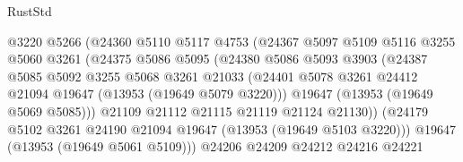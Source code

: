 \begin{lexlean}{RustStd}
\begin{coremodule}
                                @3220
                                @5266
                                (@24360
                                  @5110
                                  @5117
                                  @4753
                                  (@24367
                                    @5097
                                    @5109
                                    @5116
                                    @3255
                                    @5060
                                    @3261
                                    (@24375
                                      @5086
                                      @5095
                                      (@24380
                                        @5086
                                        @5093
                                        @3903
                                        (@24387
                                          @5085
                                          @5092
                                          @3255
                                          @5068
                                          @3261
                                          @21033
                                          (@24401
                                            @5078
                                            @3261
                                            @24412
                                            @21094
                                            @19647
                                            (@13953 (@19649 @5079 @3220)))
                                          @19647
                                          (@13953 (@19649 @5069 @5085)))
                                        @21109
                                        @21112
                                        @21115
                                        @21119
                                        @21124
                                        @21130))
                                    (@24179
                                      @5102
                                      @3261
                                      @24190
                                      @21094
                                      @19647
                                      (@13953 (@19649 @5103 @3220)))
                                    @19647
                                    (@13953 (@19649 @5061 @5109)))
                                  @24206
                                  @24209
                                  @24212
                                  @24216
                                  @24221

\end{coremodule}
\end{lexlean}
